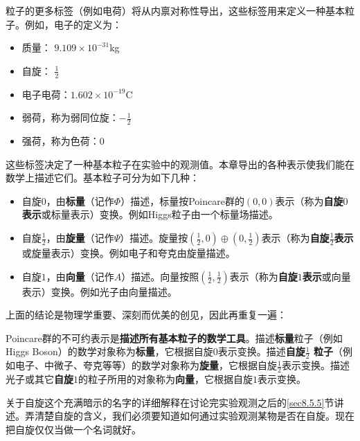 粒子的更多标签（例如电荷）将从内禀对称性导出，这些标签用来定义一种基本粒子。例如，电子的定义为：
\begin{itemize}
    \item 质量： $9.109 \times 10^{-31}$kg
    \item 自旋： $\frac{1}{2}$
    \item 电子电荷：$1.602 \times 10^{-19}$C
    \item 弱荷，称为弱同位旋：$-\frac{1}{2}$
    \item 强荷，称为色荷：$0$
\end{itemize}
这些标签决定了一种基本粒子在实验中的观测值。本章导出的各种表示使我们能在数学上描述它们。基本粒子可分为如下几种：
\begin{itemize}
    \item 自旋$0$，由{\bf 标量}（记作$\Phi$）描述，标量按Poincare群的$(0, 0)$表示（称为{\bf 自旋$0$表示}或标量表示）变换。例如Higgs粒子由一个标量场描述。
    \item 自旋$\frac{1}{2}$，由{\bf 旋量}（记作$\Psi$）描述。旋量按$(\frac{1}{2}, 0) \oplus (0, \frac{1}{2})$表示（称为{\bf 自旋$\frac{1}{2}$表示}或旋量表示）变换。例如电子和夸克由旋量描述。
    \item 自旋$1$，由{\bf 向量}（记作$A$）描述。向量按照$(\frac{1}{2}, \frac{1}{2})$表示（称为{\bf 自旋$1$表示}或向量表示）变换。例如光子由向量描述。
\end{itemize}

上面的结论是物理学重要、深刻而优美的创见，因此再重复一遍：

Poincare群的不可约表示是{\bf 描述所有基本粒子的数学工具}。描述{\bf 标量}粒子（例如Higgs Boson）的数学对象称为{\bf 标量}，它根据自旋$0$表示变换。描述{\bf 自旋$\frac{1}{2}$ 粒子}（例如电子、中微子、夸克等等）的数学对象称为{\bf 旋量}，它根据自旋$\frac{1}{2}$表示变换。描述光子或其它{\bf 自旋$1$}的粒子所用的对象称为{\bf 向量}，它根据自旋$1$表示变换。

关于自旋这个充满暗示的名字的详细解释在讨论完实验观测之后的\ref{sec8.5.5}节讲述。弄清楚自旋的含义，我们必须要知道如何通过实验观测某物是否在自旋。现在把自旋仅仅当做一个名词就好。

